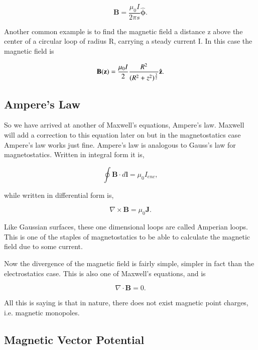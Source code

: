 \documentclass[preprint, review,12pt]{elsarticle}
\def\x{\times}
\def\.{\cdot}
\def\b{\textbf}
\def\div{\nabla \.}
\def\curl{\nabla \x}
\newcommand{\hb}[1]{\hat{\b #1}}
\newcommand{\hbm}[1]{\hat{\bm #1}}
\begin{document}
\begin{equation}
    \b{B} = \frac{\mu_0I}{2\pi s}\hbm{\phi}.
\end{equation}

Another common example is to find the magnetic field a distance z above the center of a circular loop of radius R, carrying a steady current I. In this case the magnetic field is

\begin{equation}
    \b{B}(\b{z}) = \frac{\mu_0I}{2} \frac{R^2}{(R^2+z^2)^\frac{3}{2}}\hb{z}.
\end{equation}

\subsection{Ampere's Law}

So we have arrived at another of Maxwell's equations, Ampere's law. Maxwell will add a correction to this equation later on but in the magnetostatics case Ampere's law works just fine. Ampere's law is analogous to Gauss's law for magnetostatics. Written in integral form it is,

\begin{equation}
    \oint \b{B} \. d\b{l} = \mu_0 I_{enc},
\end{equation}

while written in differential form is,

\begin{equation}
    \curl \b{B} = \mu_0 \b{J}.
\end{equation}

Like Gaussian surfaces, these one dimensional loops are called Amperian loops. This is one of the staples of magnetostatics to be able to calculate the magnetic field due to some current. 

Now the divergence of the magnetic field is fairly simple, simpler in fact than the electrostatics case. This is also one of Maxwell's equations, and is

\begin{equation}
    \div \b{B} = 0.
\end{equation}

All this is saying is that in nature, there does not exist magnetic point charges, i.e. magnetic monopoles. 

\subsection{Magnetic Vector Potential}
\end{document}
